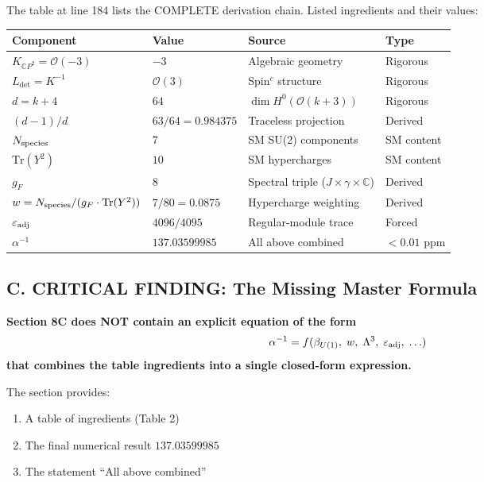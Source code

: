 The table at line 184 lists the COMPLETE derivation chain.
Listed ingredients and their values:

\begin{center}
\renewcommand{\arraystretch}{1.3}
\begin{tabular}{llll}
\toprule
Component & Value & Source & Type \\
\midrule
$K_{\mathbb{C}P^2} = \mathcal{O}(-3)$ & $-3$ & Algebraic geometry & Rigorous \\
$L_{\det} = K^{-1}$ & $\mathcal{O}(3)$ & Spin$^c$ structure & Rigorous \\
$d = k + 4$ & $64$ & $\dim H^0(\mathcal{O}(k+3))$ & Rigorous \\
$(d-1)/d$ & $63/64 = 0.984375$ & Traceless projection & Derived \\
$N_{\rm species}$ & $7$ & SM SU(2) components & SM content \\
$\mathrm{Tr}(Y^2)$ & $10$ & SM hypercharges & SM content \\
$g_F$ & $8$ & Spectral triple ($J \times \gamma \times \mathbb{C}$) & Derived \\
$w = N_{\rm species}/(g_F \cdot \mathrm{Tr}(Y^2))$ & $7/80 = 0.0875$ & Hypercharge weighting & Derived \\
$\varepsilon_{\rm adj}$ & $4096/4095$ & Regular-module trace & Forced \\
\midrule
$\alpha^{-1}$ & $137.03599985$ & All above combined & $< 0.01$ ppm \\
\bottomrule
\end{tabular}
\end{center}

\subsection*{C. CRITICAL FINDING: The Missing Master Formula}

\textbf{Section 8C does NOT contain an explicit equation of the form}
\[
  \alpha^{-1} = f(\beta_{U(1)},\; w,\; \Lambda^3,\; \varepsilon_{\rm adj},\; \ldots)
\]
\textbf{that combines the table ingredients into a single closed-form expression.}

The section provides:
\begin{enumerate}
  \item A table of ingredients (Table 2)
  \item The final numerical result $137.03599985$
  \item The statement ``All above combined''
\end{enumerate}

